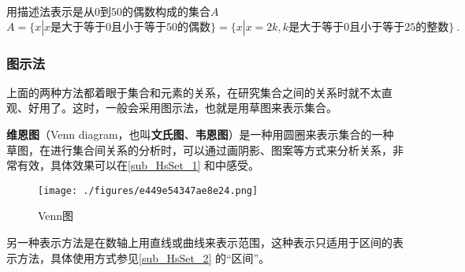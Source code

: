 

\begin{example}{用描述法表示是从$0$到$50$的偶数构成的集合$A$}
$$A=\{x|x\text{是大于等于}0\text{且小于等于}50\text{的偶数}\}=\{x|x=2k,k\text{是大于等于}0\text{且小于等于}25\text{的整数}\}~.$$
\end{example}

\subsubsection{图示法}
上面的两种方法都着眼于集合和元素的关系，在研究集合之间的关系时就不太直观、好用了。这时，一般会采用图示法，也就是用草图来表示集合。

\textbf{维恩图}（Venn diagram，也叫\textbf{文氏图}、\textbf{韦恩图}）是一种用圆圈来表示集合的一种草图，在进行集合间关系的分析时，可以通过画阴影、图案等方式来分析关系，非常有效，具体效果可以在\autoref{sub_HsSet_1} 和中感受。
\begin{figure}[ht]
\centering
\texttt{[image: ./figures/e449e54347ae8e24.png]}
\caption{Venn图} \label{fig_SufCnd_1}
\end{figure}

另一种表示方法是在数轴上用直线或曲线来表示范围，这种表示只适用于区间的表示方法，具体使用方式参见\autoref{sub_HsSet_2} 的“区间”。


